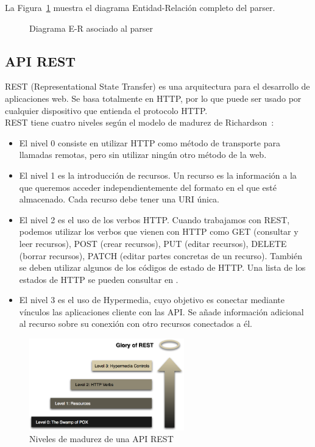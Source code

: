 La Figura~\ref{fig:er-parser} muestra el diagrama Entidad-Relación completo del parser.

\begin{figure}[htb]
\centering
\erparser
\caption{Diagrama E-R asociado al parser}
\label{fig:er-parser}
\end{figure}

\clearpage

\subsection*{API REST}

REST (Representational State Transfer) es una arquitectura para el desarrollo de aplicaciones web. Se basa totalmente en HTTP, por lo que puede ser usado por cualquier dispositivo que entienda el protocolo HTTP.\\

REST tiene cuatro niveles según el modelo de madurez de Richardson~\cite{richardson}:

\begin{itemize}
\item El nivel 0 consiste en utilizar HTTP como método de transporte para llamadas remotas, pero sin utilizar ningún otro método de la web.

\item El nivel 1 es la introducción de recursos. Un recurso es la información a la que queremos acceder independientemente del formato en el que esté almacenado. Cada recurso debe tener una URI única.

\item El nivel 2 es el uso de los verbos HTTP. Cuando trabajamos con REST, podemos utilizar los verbos que vienen con HTTP como GET (consultar y leer recursos), POST (crear recursos), PUT (editar recursos), DELETE (borrar recursos), PATCH (editar partes concretas de un recurso). También se deben utilizar algunos de los códigos de estado de HTTP. Una lista de los estados de HTTP se pueden consultar en \cite{http-status}.

\item El nivel 3 es el uso de Hypermedia, cuyo objetivo es conectar mediante vínculos las aplicaciones cliente con las API. Se añade información adicional al recurso sobre su conexión con otro recursos conectados a él.
\end{itemize}

\begin{figure}[htb]
\centering
\includegraphics[width=0.6\textwidth]{imagenes/rest-levels}
\caption{Niveles de madurez de una API REST}
\label{fig:niveles-api-rest}
\end{figure}

